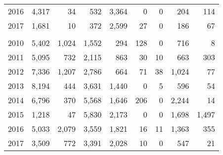 \documentclass[]{article}
\begin{document}
\begin{table}
\begin{tabular}[t]{lrrrrrrrr}
\hspace{1em}\hspace{1em}\hspace{1em}\hspace{1em}2016 & 4,317 & 34 & 532 & 3,364 & 0 & 0 & 204 & 114\\
\hspace{1em}\hspace{1em}\hspace{1em}\hspace{1em}2017 & 1,681 & 10 & 372 & 2,599 & 27 & 0 & 186 & 67\\
\addlinespace[0.3em]
\multicolumn{9}{l}{\textbf{Cape Simpson}}\\
\hspace{1em}\hspace{1em}\hspace{1em}\hspace{1em}2010 & 5,402 & 1,024 & 1,552 & 294 & 128 & 0 & 716 & 8\\
\hspace{1em}\hspace{1em}\hspace{1em}\hspace{1em}2011 & 5,095 & 732 & 2,115 & 863 & 30 & 10 & 663 & 303\\
\hspace{1em}\hspace{1em}\hspace{1em}\hspace{1em}2012 & 7,336 & 1,207 & 2,786 & 664 & 71 & 38 & 1,024 & 77\\
\hspace{1em}\hspace{1em}\hspace{1em}\hspace{1em}2013 & 8,194 & 444 & 3,631 & 1,440 & 0 & 5 & 596 & 54\\
\hspace{1em}\hspace{1em}\hspace{1em}\hspace{1em}2014 & 6,796 & 370 & 5,568 & 1,646 & 206 & 0 & 2,244 & 14\\
\hspace{1em}\hspace{1em}\hspace{1em}\hspace{1em}2015 & 1,218 & 47 & 5,830 & 2,173 & 0 & 0 & 1,698 & 1,497\\
\hspace{1em}\hspace{1em}\hspace{1em}\hspace{1em}2016 & 5,033 & 2,079 & 3,559 & 1,821 & 16 & 11 & 1,363 & 355\\
\hspace{1em}\hspace{1em}\hspace{1em}\hspace{1em}2017 & 3,509 & 772 & 3,391 & 2,028 & 10 & 0 & 547 & 21\\
\bottomrule
\end{tabular}
\end{table}
\end{document}
